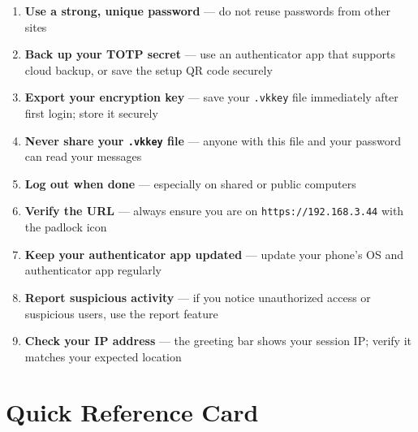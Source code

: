 \documentclass[12pt,a4paper]{article}
\begin{document}
\begin{enumerate}[leftmargin=*]
  \item \textbf{Use a strong, unique password} --- do not reuse passwords from other sites
  \item \textbf{Back up your TOTP secret} --- use an authenticator app that supports cloud backup, or save the setup QR code securely
  \item \textbf{Export your encryption key} --- save your \texttt{.vkkey} file immediately after first login; store it securely
  \item \textbf{Never share your \texttt{.vkkey} file} --- anyone with this file and your password can read your messages
  \item \textbf{Log out when done} --- especially on shared or public computers
  \item \textbf{Verify the URL} --- always ensure you are on \texttt{https://192.168.3.44} with the padlock icon
  \item \textbf{Keep your authenticator app updated} --- update your phone's OS and authenticator app regularly
  \item \textbf{Report suspicious activity} --- if you notice unauthorized access or suspicious users, use the report feature
  \item \textbf{Check your IP address} --- the greeting bar shows your session IP; verify it matches your expected location
\end{enumerate}


\appendix

\section{Quick Reference Card}
\end{document}
